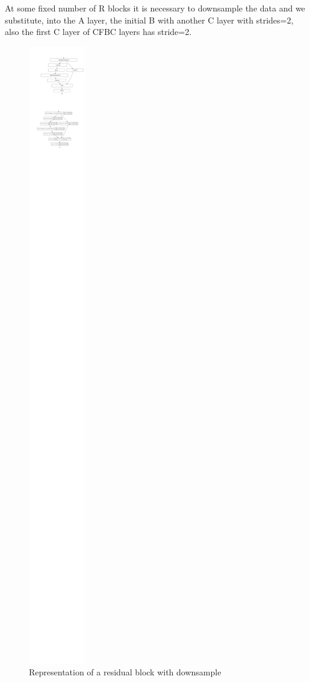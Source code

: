 \documentclass[10pt,twocolumn,letterpaper]{article}
\begin{document}
At some fixed number of R blocks it is necessary to downsample the data and we substitute, into the A layer, the initial B with another C layer with strides=2, also the first C layer of CFBC layers has stride=2.
\begin{figure}[H]
   \centering
   \includegraphics[width=0.7\linewidth]{./immagini/residual_block_with_downsample.pdf}
   \caption{Representation of a residual block with downsample}
\end{figure}
\def\arraystretch{1.2}
\end{document}
